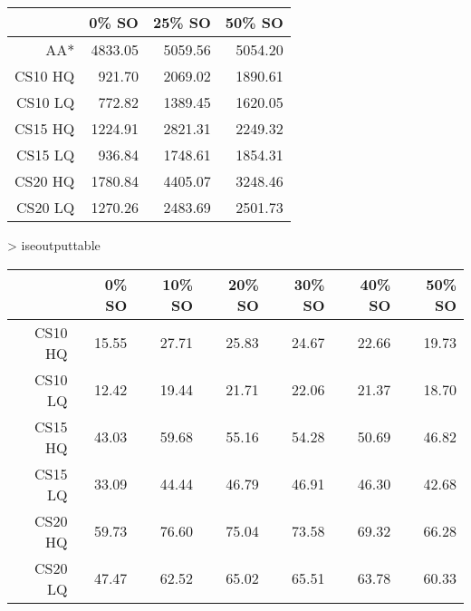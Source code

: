 \begin{table}[ht]
\begin{center}
\begin{tabular}{rrrr}
  \hline
 & 0\% SO & 25\% SO & 50\% SO \\
  \hline
AA* & 4833.05 & 5059.56 & 5054.20 \\
  CS10 HQ & 921.70 & 2069.02 & 1890.61 \\
  CS10 LQ & 772.82 & 1389.45 & 1620.05 \\
  CS15 HQ & 1224.91 & 2821.31 & 2249.32 \\
  CS15 LQ & 936.84 & 1748.61 & 1854.31 \\
  CS20 HQ & 1780.84 & 4405.07 & 3248.46 \\
  CS20 LQ & 1270.26 & 2483.69 & 2501.73 \\
   \hline
\end{tabular}
\end{center}
\end{table}
> iseoutputtable
\begin{table}[ht]
\begin{center}
\begin{tabular}{rrrrrrr}
  \hline
 & 0\% SO & 10\% SO & 20\% SO & 30\% SO & 40\% SO & 50\% SO \\
  \hline
CS10 HQ & 15.55 & 27.71 & 25.83 & 24.67 & 22.66 & 19.73 \\
  CS10 LQ & 12.42 & 19.44 & 21.71 & 22.06 & 21.37 & 18.70 \\
  CS15 HQ & 43.03 & 59.68 & 55.16 & 54.28 & 50.69 & 46.82 \\
  CS15 LQ & 33.09 & 44.44 & 46.79 & 46.91 & 46.30 & 42.68 \\
  CS20 HQ & 59.73 & 76.60 & 75.04 & 73.58 & 69.32 & 66.28 \\
  CS20 LQ & 47.47 & 62.52 & 65.02 & 65.51 & 63.78 & 60.33 \\
   \hline
\end{tabular}
\end{center}
\end{table}
